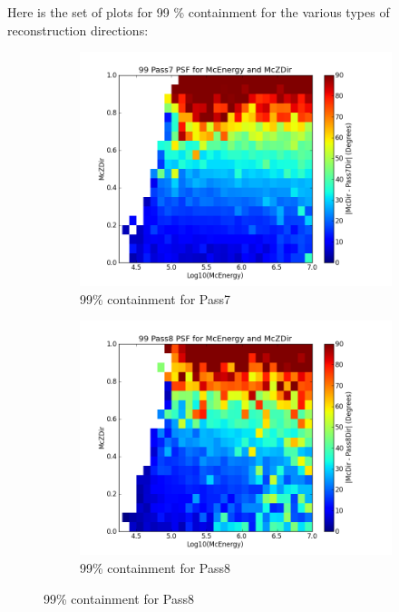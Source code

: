 \documentclass[11pt]{article}
\begin{document}
\newpage
Here is the set of plots for 99 \% containment for the various types of reconstruction directions:

\begin{figure}[h]
        \centering
        \begin{subfigure}[b]{0.5\textwidth}
                \centering
                \includegraphics[width=\textwidth]{psf99_2D_pass7}
                \caption{99\% containment for Pass7}
                \label{con99_old}
        \end{subfigure}%
        \begin{subfigure}[b]{0.5\textwidth}
                \centering
                \includegraphics[width=\textwidth]{psf99_2D_pass8}
                \caption{99\% containment for Pass8}

\end{subfigure}
\end{figure}
\end{document}
